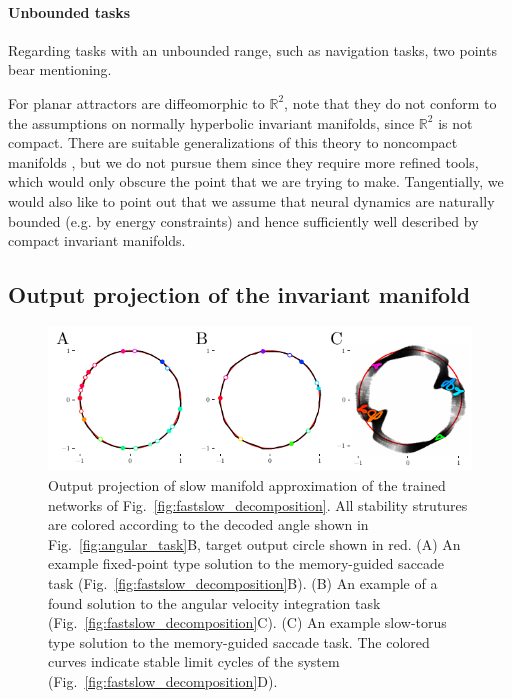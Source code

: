 \documentclass{article} %
\newcounter{ct}
\newcommand{\reals}{\mathbb{R}}
\theoremstyle{definition}
\theoremstyle{remark}
\begin{document}
\paragraph{Unbounded tasks}
Regarding tasks with an unbounded range, such as navigation tasks, two points bear mentioning.

For planar attractors are diffeomorphic to \(\reals^{2}\), note that they do not conform to the assumptions on normally hyperbolic invariant manifolds, since \(\reals^{2}\) is not compact.
There are suitable generalizations of this theory to noncompact manifolds \citep{eldering2013normally}, but we do not pursue them since they require more refined tools, which would only obscure the point that we are trying to make.
Tangentially, we would also like to point out that we assume that neural dynamics are naturally bounded (e.g. by energy constraints) and hence sufficiently well described by compact invariant manifolds.


\subsection{Output projection of the invariant manifold}

\begin{figure}[tbhp]
  \centering
  \includegraphics[width=\textwidth]{fastslow_decomposition_outputs_s}
  \caption{Output projection of slow manifold approximation of the trained networks of Fig.~\ref{fig:fastslow_decomposition}. All stability strutures are colored according to the decoded angle shown in Fig.~\ref{fig:angular_task}B, target output circle shown in red.
 (A) An example fixed-point type solution to the memory-guided saccade task (Fig.~\ref{fig:fastslow_decomposition}B).
 (B) An example of a found solution to the angular velocity integration task (Fig.~\ref{fig:fastslow_decomposition}C).
 (C) An example slow-torus type solution to the memory-guided saccade task. The colored curves indicate stable limit cycles of the system (Fig.~\ref{fig:fastslow_decomposition}D).
}\label{fig:fastslow_decomposition_otuput}
\end{figure}
\end{document}
